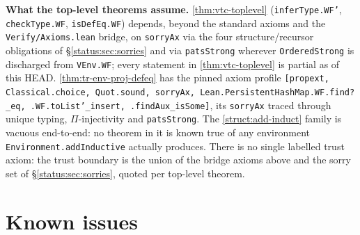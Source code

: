 \textbf{What the top-level theorems assume.} \ref{thm:vtc-toplevel} (\texttt{inferType.WF'}, \texttt{checkType.WF}, \texttt{isDefEq.WF}) depends, beyond the standard axioms and the \texttt{Verify/Axioms.lean} bridge, on \texttt{sorryAx} via the four structure/recursor obligations of \S\ref{status:sec:sorries} and via \texttt{patsStrong} wherever \texttt{OrderedStrong} is discharged from \texttt{VEnv.WF}; every statement in \ref{thm:vtc-toplevel} is partial as of this HEAD. \ref{thm:tr-env-proj-defeq} has the pinned axiom profile \texttt{[propext, Classical.choice, Quot.sound, sorryAx, Lean.PersistentHashMap.WF.find?\_eq, .WF.toList'\_insert, .findAux\_isSome]}, its \texttt{sorryAx} traced through unique typing, $\Pi$-injectivity and \texttt{patsStrong}. The \ref{struct:add-induct} family is vacuous end-to-end: no theorem in it is known true of any environment \texttt{Environment.addInductive} actually produces. There is no single labelled trust axiom: the trust boundary is the union of the bridge axioms above and the sorry set of \S\ref{status:sec:sorries}, quoted per top-level theorem.

\section{Known issues}
\label{status:sec:issues}
\label{status:sec:limits}

